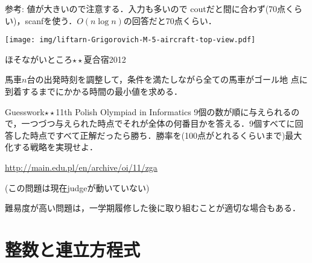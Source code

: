  参考: 値が大きいので注意する．入力も多いので
 coutだと間に合わず(70点くらい)，scanfを使う．$O(n\log n)$の回答だと70点くらい．

\begin{flushright}
\texttt{[image: img/liftarn-Grigorovich-M-5-aircraft-top-view.pdf]}
\end{flushright}
 
\begin{pbox}{ほそながいところ$\star\star$}{夏合宿2012}
  
馬車$n$台の出発時刻を調整して，条件を満たしながら全ての馬車がゴール地
点に到着するまでにかかる時間の最小値を求める．

\end{pbox}

\begin{pbox}{Guesswork$\star\star$}{11th Polish Olympiad in Informatics}
  9個の数が順に与えられるので，一つづつ与えられた時点でそれが全体の何番目かを答える．9個すべてに回答した時点ですべて正解だったら勝ち．勝率を(100点がとれるくらいまで)最大化する戦略を実現せよ．

\url{http://main.edu.pl/en/archive/oi/11/zga}

(この問題は現在judgeが動いていない)
\end{pbox}


難易度が高い問題は，一学期履修した後に取り組むことが適切な場合もある．
 
\chapter{整数と連立方程式}

